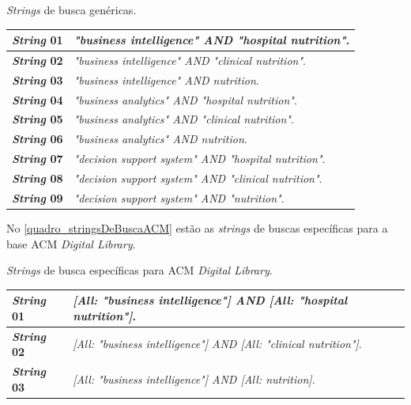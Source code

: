 \begin{quadro}[htb]
\caption{\label{quadro_stringsDeBusca}\textit{Strings} de busca genéricas.}
\label{}
\begin{tabular}{|p{2cm}|p{9cm}|}
	\hline
	\textbf{\textit{String} 01}	& \textit{"business intelligence" AND "hospital nutrition"}.  \\ \hline
	\textbf{\textit{String} 02}	& \textit{"business intelligence" AND "clinical nutrition"}.   \\ \hline
	\textbf{\textit{String} 03}	& \textit{"business intelligence" AND nutrition}.   \\ \hline
	\textbf{\textit{String} 04}	& \textit{"business analytics" AND "hospital nutrition"}.	\\ \hline
	\textbf{\textit{String} 05}	& \textit{"business analytics" AND "clinical nutrition"}. \\ \hline
	\textbf{\textit{String} 06}	& \textit{"business analytics" AND nutrition}. \\ \hline
	\textbf{\textit{String} 07}	& \textit{"decision support system" AND "hospital nutrition"}.\\ \hline
    \textbf{\textit{String} 08}	& \textit{"decision support system" AND "clinical nutrition"}.\\ \hline
    \textbf{\textit{String} 09}	& \textit{"decision support system" AND "nutrition"}.\\ \hline
\end{tabular}
\end{quadro}

No \autoref{quadro_stringsDeBuscaACM} estão as \textit{strings} de buscas específicas para a base ACM \textit{Digital Library}.

\begin{quadro}[htb]
\caption{\label{quadro_stringsDeBuscaACM}\textit{Strings} de busca específicas para ACM \textit{Digital Library}.}
\label{}
\begin{tabular}{|p{2cm}|p{11cm}|}
	\hline
	\textbf{\textit{String} 01}	& \textit{[All: "business intelligence"] AND [All: "hospital nutrition"]}.  \\ \hline
    \textbf{\textit{String} 02}	& \textit{[All: "business intelligence"] AND [All: "clinical nutrition"]}.   \\ \hline
    \textbf{\textit{String} 03}	& \textit{[All: "business intelligence"] AND [All: nutrition]}.   \\ \hline
\end{tabular}
\end{quadro}	

